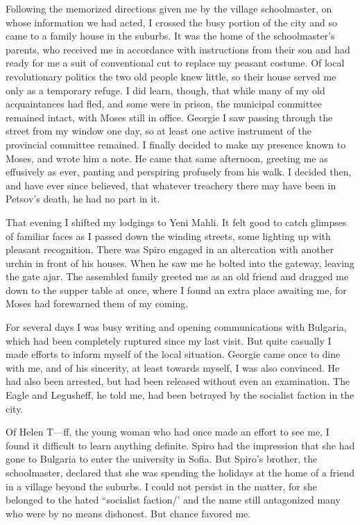 \documentclass[a5paper,12pt]{book}
\begin{document}
Following the memorized directions given me by the village schoolmaster, on whose information we had acted, I crossed the busy portion of the city and so came to a family house in the suburbs. It was the home of the schoolmaster’s parents, who received me in accordance with instructions from their son and had ready for me a suit of conventional cut to replace my peasant costume. Of local revolutionary politics the two old people knew little, so their house served me only as a temporary refuge. I did learn, though, that while many of my old acquaintances had fled, and some were in prison, the municipal committee remained intact, with Moses still in office. Georgie I saw passing through the street from my window one day, so at least one active instrument of the provincial committee remained. I finally decided to make my presence known to Moses, and wrote him a note.
He came that same afternoon, greeting me as effusively as ever, panting and perspiring profusely from his walk. I decided then, and have ever since believed, that whatever treachery there may have been in Petsov’s death, he had no part in it. 

That evening I shifted my lodgings to Yeni Mahli. It felt good to catch glimpses of familiar faces as I passed down the winding streets, some lighting up with pleasant recognition. There was Spiro engaged in an altercation with another urchin in front of his houses. When he saw me he bolted into the gateway, leaving the gate ajar. The assembled family greeted me as an old friend and dragged me down to the supper table at once, where I found an extra place awaiting me, for Moses had forewarned them of my coming. 

For several days I was busy writing and opening communications with Bulgaria, which had been completely ruptured since my last visit. But quite casually I made efforts to inform myself of the local situation. Georgie came once to dine with me, and of his sincerity, at least towards myself, I was also convinced. He had also been arrested, but had been released without even an examination. The Eagle and Legusheff, he told me, had been betrayed by the socialist faction in the city. 

Of Helen T—ff, the young woman who had once made an effort to see me, I found it difficult to learn anything definite. Spiro had the impression that she had gone to Bulgaria to enter the university in Sofia. But Spiro’s brother, the schoolmaster, declared that she was spending the holidays at the home of a friend in a village beyond the suburbs. I could not persist in the matter, for she belonged to the hated “socialist faction/’ and the name still antagonized many who were by no means dishonest. But chance favored me. 
\end{document}
